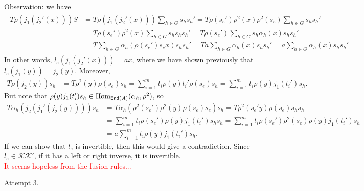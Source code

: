 \newpage

\noindent Observation: we have
\begin{align*}
\begin{split}
T\rho(j_1(j_2'(x)))S &= T\rho(j_1(j_2'(x)))\sum_{h \in G}{s_hs_h'} = T\rho(s_e')\rho^2(x)\rho^2(s_e)\sum_{h \in G}{s_hs_h'}\\
&= T\rho(s_e')\rho^2(x)\sum_{h \in G}{s_hs_hs_h'} = T\rho(s_e')\sum_{h \in G}{s_h\alpha_h(x)s_hs_h'}\\
&= T\sum_{h \in G}{\alpha_h(\rho(s_e')s_ex)s_hs_h'} = Ta\sum_{h \in G}{\alpha_h(x)s_hs_h'} = a\sum_{h \in G}{\alpha_h(x)s_hs_h'}
\end{split}
\end{align*}
\noindent In other words, $l_e(j_1(j_2'(x))) = ax$, where we have shown previously that $l_e(j_1(y)) = j_2(y)$. Moreover,
\begin{align*}
T\rho(j_2(y))s_h &= T\rho^2(y)\rho(s_e)s_h = \sum_{i=1}^m t_i\rho(y)t_i'\rho(s_e)s_h = \sum_{i=1}^m t_i\rho(y)j_1(t_i')s_h.
\end{align*}
\noindent But note that $\rho(y)j_1(t_i')s_h \in \textup{Hom}_{\textup{\textsf{End}}(A)}(\alpha_h, \rho^2)$, so
\begin{align*}
T\alpha_h(j_2(j_1'(j_2(y))))s_h &= T\alpha_h(\rho^2(s_e')\rho^2(y)\rho(s_e)s_e)s_h = T\rho^2(s_e'y)\rho(s_e)s_hs_h\\
&= \sum_{i=1}^m t_i\rho(s_e')\rho(y)j_1(t_i')s_hs_h = \sum_{i=1}^m t_i\rho(s_e')\rho^2(s_e)\rho(y)j_1(t_i')s_h\\
&= a\sum_{i=1}^m t_i\rho(y)j_1(t_i')s_h.
\end{align*}
\noindent If we can show that $l_e$ is invertible, then this would give a contradiction. Since $l_e \in \mathcal{K}\mathcal{K}'$, if it has a left or right inverse, it is invertible.\\

\noindent\textcolor{red}{It seems hopeless from the fusion rules...}\\

\newpage

\noindent Attempt 3. 

\newpage

